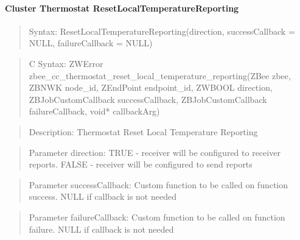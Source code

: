 \paragraph{Cluster Thermostat ResetLocalTemperatureReporting}
\begin{quote}Syntax: ResetLocalTemperatureReporting(direction, successCallback = NULL, failureCallback = NULL)\end{quote}
\begin{quote}C Syntax: ZWError zbee\_cc\_thermostat\_reset\_local\_temperature\_reporting(ZBee zbee, ZBNWK node\_id, ZEndPoint endpoint\_id, ZWBOOL direction, ZBJobCustomCallback successCallback, ZBJobCustomCallback failureCallback, void* callbackArg)\end{quote}
\begin{quote}Description: Thermostat Reset Local Temperature Reporting\end{quote}
\begin{quote}Parameter direction: TRUE  - receiver will be configured to receiver reports. FALSE - receiver will be configured to send reports\end{quote}
\begin{quote}Parameter successCallback: Custom function to be called on function success. NULL if callback is not needed\end{quote}
\begin{quote}Parameter failureCallback: Custom function to be called on function failure. NULL if callback is not needed\end{quote}


